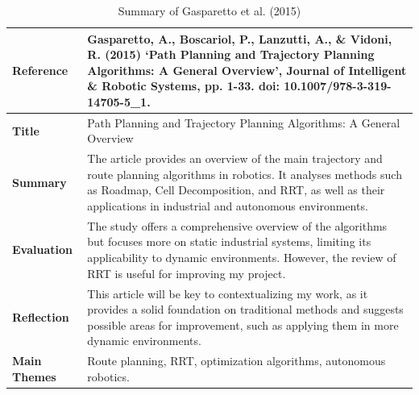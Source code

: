 \documentclass[a4paper,11pt]{report}
\begin{document}
\begin{table}[H]
    \centering
    \begin{tabular}{|p{3cm}|p{10cm}|}
        \hline
        \textbf{Reference} & Gasparetto, A., Boscariol, P., Lanzutti, A., \& Vidoni, R. (2015) ‘Path Planning and Trajectory Planning Algorithms: A General Overview’, Journal of Intelligent \& Robotic Systems, pp. 1-33. doi: 10.1007/978-3-319-14705-5\_1. \\ \hline
        \textbf{Title} & Path Planning and Trajectory Planning Algorithms: A General Overview \\ \hline
        \textbf{Summary} & The article provides an overview of the main trajectory and route planning algorithms in robotics. It analyses methods such as Roadmap, Cell Decomposition, and RRT, as well as their applications in industrial and autonomous environments. \\ \hline
        \textbf{Evaluation} & The study offers a comprehensive overview of the algorithms but focuses more on static industrial systems, limiting its applicability to dynamic environments. However, the review of RRT is useful for improving my project. \\ \hline
        \textbf{Reflection} & This article will be key to contextualizing my work, as it provides a solid foundation on traditional methods and suggests possible areas for improvement, such as applying them in more dynamic environments. \\ \hline
        \textbf{Main Themes} & Route planning, RRT, optimization algorithms, autonomous robotics. \\ \hline
    \end{tabular}
    \caption{Summary of Gasparetto et al. (2015)}
    \label{tab:gasparetto2015}
\end{table}
\end{document}
